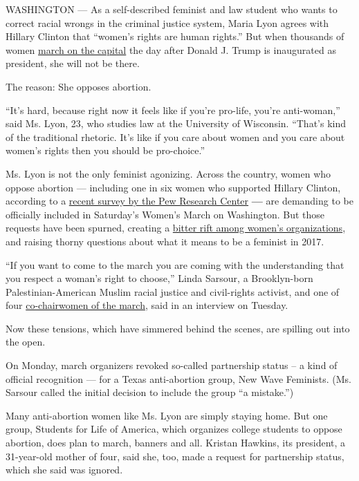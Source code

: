 WASHINGTON --- As a self-described feminist and law student who wants to
correct racial wrongs in the criminal justice system, Maria Lyon agrees
with Hillary Clinton that ``women's rights are human rights.'' But when
thousands of women
\href{https://www.nytimes3xbfgragh.onion/interactive/2017/01/10/us/politics/womens-march-guide.html}{march
on the capital} the day after Donald J. Trump is inaugurated as
president, she will not be there.

The reason: She opposes abortion.

``It's hard, because right now it feels like if you're pro-life, you're
anti-woman,'' said Ms. Lyon, 23, who studies law at the University of
Wisconsin. ``That's kind of the traditional rhetoric. It's like if you
care about women and you care about women's rights then you should be
pro-choice.''

Ms. Lyon is not the only feminist agonizing. Across the country, women
who oppose abortion --- including one in six women who supported Hillary
Clinton, according to a
\href{http://www.pewresearch.org/fact-tank/2016/11/03/women-drive-increase-in-democratic-support-for-legal-abortion/}{recent
survey by the Pew Research Center} \textbf{---} are demanding to be
officially included in Saturday's Women's March on Washington. But those
requests have been spurned, creating a
\href{https://www.nytimes3xbfgragh.onion/2017/01/09/us/womens-march-on-washington-opens-contentious-dialogues-about-race.html?_r=0}{bitter
rift among women's organizations}, and raising thorny questions about
what it means to be a feminist in 2017.

``If you want to come to the march you are coming with the understanding
that you respect a woman's right to choose,'' Linda Sarsour, a
Brooklyn-born Palestinian-American Muslim racial justice and
civil-rights activist, and one of four
\href{https://www.womensmarch.com/team/}{co-chairwomen of the march},
said in an interview on Tuesday.

Now these tensions, which have simmered behind the scenes, are spilling
out into the open.

On Monday, march organizers revoked so-called partnership status -- a
kind of official recognition --- for a Texas anti-abortion group, New
Wave Feminists. (Ms. Sarsour called the initial decision to include the
group ``a mistake.'')

Many anti-abortion women like Ms. Lyon are simply staying home. But one
group, Students for Life of America, which organizes college students to
oppose abortion, does plan to march, banners and all. Kristan Hawkins,
its president, a 31-year-old mother of four, said she, too, made a
request for partnership status, which she said was ignored.

